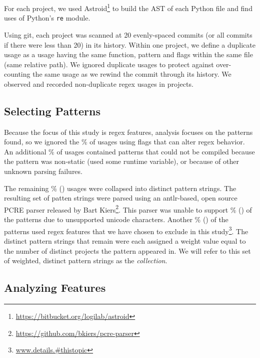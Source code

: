 For each project, we used Astroid\footnote{\url{https://bitbucket.org/logilab/astroid}} to build the AST of each Python file and find uses of Python's {\tt re} module.

Using git, each project was scanned at 20 evenly-spaced commits (or all commits if there were less than 20) in its history.
Within one project, we define a duplicate usage as a usage having the same function, pattern and flags within the same file (same relative path).  We ignored duplicate usages to protect against over-counting the same usage as we rewind the commit through its history.  We observed and recorded  non-duplicate regex usages in  projects.

\subsection{Selecting Patterns}
Because the focus of this study is regex features,  analysis focuses on the patterns found, so we ignored the \%  of usages using flags that can alter regex behavior.  An additional \% of usages contained patterns that could not be compiled because the pattern was non-static (used some runtime variable), or because of other unknown parsing failures.

The remaining \% () usages were collapsed into  distinct pattern strings.  The resulting set of patten strings were parsed using an antlr-based, open source PCRE parser released by Bart Kiers\footnote{\url{https://github.com/bkiers/pcre-parser}}.  This parser was unable to support \% () of the patterns due to unsupported unicode characters.  Another \% () of the patterns used regex features that we have chosen to exclude in this study\footnote{\url{www.details.#thistopic}}.  The  distinct pattern strings that remain were each assigned a weight value equal to the number of distinct projects the pattern appeared in.  We will refer to this set of weighted, distinct pattern strings as the \emph{collection}.

\subsection{Analyzing Features}
\label{study:features}

